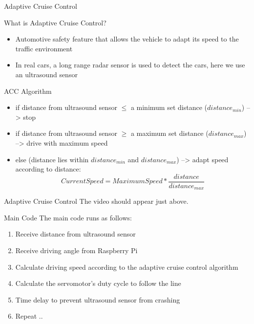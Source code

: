\begin{frame}[plain]{Adaptive Cruise Control}

What is Adaptive Cruise Control?
\pause
\begin{itemize}
	\item Automotive safety feature that allows the vehicle to adapt its speed to the traffic environment 
	\pause
	\item In real cars, a long range radar sensor is used to detect the cars, here we use an ultrasound sensor
\end{itemize}
\pause	
\vspace{1cm}
ACC Algorithm
\pause
\begin{itemize}
	\item if distance from ultrasound sensor $\leq$ a minimum set distance ($distance_{min}$) --> stop
	\pause
	\item if distance from ultrasound sensor $\geq$ a maximum set distance ($distance_{max}$) --> drive with maximum speed
	\pause
	\item else (distance lies within $distance_{min}$ and $distance_{max}$) --> adapt speed according to distance:
	\pause
	$$Current Speed = Maximum Speed * \frac{distance}{distance_{max}}$$
\end{itemize}
\end{frame}

\begin{frame}[plain]{Adaptive Cruise Control}
The video should appear just above.
	
\end{frame}

\begin{frame}[plain]{Main Code}
The main code runs as follows:
\begin{enumerate}
\item Receive distance from ultrasound sensor 
\pause
\item Receive driving angle from Raspberry Pi
\pause
\item Calculate driving speed according to the adaptive cruise control algorithm
\pause
\item Calculate the servomotor's duty cycle to follow the line
\pause
\item Time delay to prevent ultrasound sensor from crashing
\pause
\item Repeat ..
\end{enumerate}
\end{frame}